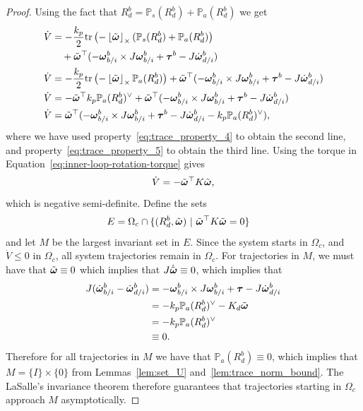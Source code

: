 \begin{proof}
Using the fact that $R_d^b=\mathbb{P}_s(R_d^b)+\mathbb{P}_a(R_d^b)$ we get
\begin{align*}
\dot{V} &= -\frac{k_p}{2} \text{tr}\left(-\left\lfloor\tilde{\boldsymbol{\omega}}\right\rfloor_{\times} (\mathbb{P}_s(R_d^b)+\mathbb{P}_a(R_d^b) \right) \\
		&\quad + \tilde{\boldsymbol{\omega}}^\top ( -\boldsymbol{\omega}_{b/i}^b \times J\boldsymbol{\omega}_{b/i}^b + \boldsymbol{\tau}^b - J\dot{\boldsymbol{\omega}}_{d/i}^b) \\
\dot{V} &= -\frac{k_p}{2} \text{tr}\left(-\left\lfloor\tilde{\boldsymbol{\omega}}\right\rfloor_{\times} \mathbb{P}_a(R_d^b) \right) + \tilde{\boldsymbol{\omega}}^\top ( -\boldsymbol{\omega}_{b/i}^b \times J\boldsymbol{\omega}_{b/i}^b + \boldsymbol{\tau}^b - J\dot{\boldsymbol{\omega}}_{d/i}^b) \\
\dot{V} &= -\tilde{\boldsymbol{\omega}}^\top k_p\mathbb{P}_a(R_d^b)^\vee + \tilde{\boldsymbol{\omega}}^\top ( -\boldsymbol{\omega}_{b/i}^b \times J\boldsymbol{\omega}_{b/i}^b + \boldsymbol{\tau}^b - J\dot{\boldsymbol{\omega}}_{d/i}^b) \\
\dot{V} &= \tilde{\boldsymbol{\omega}}^\top ( -\boldsymbol{\omega}_{b/i}^b \times J \boldsymbol{\omega}_{b/i}^b + \boldsymbol{\tau}^b - J\dot{\boldsymbol{\omega}}_{d/i}^b - k_p\mathbb{P}_a(R_d^b)^\vee ),
\end{align*}
where we have used property~\eqref{eq:trace_property_4} to obtain the second line, and property~\eqref{eq:trace_property_5} to obtain the third line.
Using the torque in Equation~\eqref{eq:inner-loop-rotation-torque} gives
\[
\dot{V} = -\tilde{\boldsymbol{\omega}}^\top K \tilde{\boldsymbol{\omega}},
\]
which is negative semi-definite.  Define the sets
\begin{align*}	
E &= \Omega_c \cap \{(R_d^b,\tilde{\boldsymbol{\omega}})~|~ \tilde{\boldsymbol{\omega}}^\top K \tilde{\boldsymbol{\omega}}=0\}
\end{align*}
and let $M$ be the largest invariant set in $E$.  Since the system starts in $\Omega_c$, and $\dot{V}\leq 0$ in $\Omega_c$, all system trajectories remain in $\Omega_c$.  
For trajectories in $M$, we must have that $\tilde{\boldsymbol{\omega}}\equiv 0$ which implies that $J\dot{\tilde{\boldsymbol{\omega}}}\equiv 0$,
which implies that
\begin{align*}
J(\dot{\boldsymbol{\omega}}_{b/i}^b-\dot{\boldsymbol{\omega}}_{d/i}^b) &= -\boldsymbol{\omega}_{b/i}^b \times J\boldsymbol{\omega}_{b/i}^b + \boldsymbol{\tau} - J\dot{\boldsymbol{\omega}}_{d/i}^b \\
	&= -k_p\mathbb{P}_a(R_d^b)^\vee - K_d\tilde{\boldsymbol{\omega}} \\
	&= -k_p\mathbb{P}_a(R_d^b)^\vee \\
	&\equiv 0.
\end{align*}
Therefore for all trajectories in $M$ we have that $\mathbb{P}_a(R_d^b)\equiv 0$, which implies that $M = \{I\} \times \{0\}$ from Lemmas~\ref{lem:set_U} and~\ref{lem:trace_norm_bound}.
The LaSalle's invariance theorem therefore guarantees that trajectories starting in $\Omega_c$ approach $M$ asymptotically. 
\end{proof}

